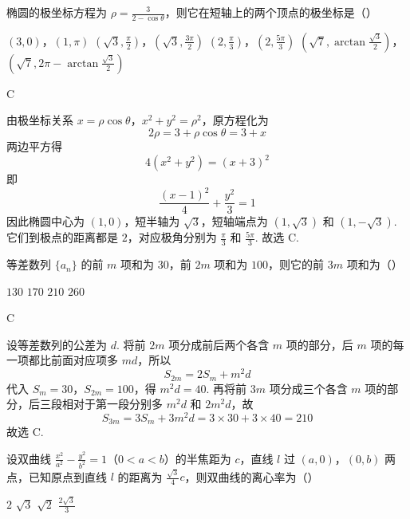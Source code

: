 \begin{problem}
椭圆的极坐标方程为 \(\rho = \frac{3}{2 - \cos\theta}\)，则它在短轴上的两个顶点的极坐标是（\quad）

\choices
    {\((3,0)\)，\((1,\pi)\)}
    {\(\left(\sqrt{3},\frac{\pi}{2}\right)\)，\(\left(\sqrt{3},\frac{3\pi}{2}\right)\)}
    {\(\left(2,\frac{\pi}{3}\right)\)，\(\left(2,\frac{5\pi}{3}\right)\)}
    {\(\left(\sqrt{7}, \arctan \frac{\sqrt{3}}{2}\right)\)，\(\left(\sqrt{7}, 2\pi - \arctan \frac{\sqrt{3}}{2}\right)\)}
\end{problem}

\begin{answer}
C
\end{answer}

\begin{solution}
由极坐标关系 \(x=\rho\cos\theta\)，\(x^2+y^2=\rho^2\)，原方程化为
\[
2\rho=3+\rho\cos\theta=3+x
\]
两边平方得
\[
4(x^2+y^2)=(x+3)^2
\]
即
\[
\frac{(x-1)^2}{4}+\frac{y^2}{3}=1
\]
因此椭圆中心为 \((1,0)\)，短半轴为 \(\sqrt3\)，短轴端点为 \((1,\sqrt3)\) 和 \((1,-\sqrt3)\). 它们到极点的距离都是 \(2\)，对应极角分别为 \(\frac{\pi}{3}\) 和 \(\frac{5\pi}{3}\). 故选 C.
\end{solution}

\begin{problem}
等差数列 \(\{a_{n}\}\) 的前 \(m\) 项和为 \(30\)，前 \(2m\) 项和为 \(100\)，则它的前 \(3m\) 项和为（\quad）

\choices
    {\(130\)}
    {\(170\)}
    {\(210\)}
    {\(260\)}
\end{problem}

\begin{answer}
C
\end{answer}

\begin{solution}
设等差数列的公差为 \(d\). 将前 \(2m\) 项分成前后两个各含 \(m\) 项的部分，后 \(m\) 项的每一项都比前面对应项多 \(md\)，所以
\[
S_{2m}=2S_m+m^2d
\]
代入 \(S_m=30\)，\(S_{2m}=100\)，得 \(m^2d=40\). 再将前 \(3m\) 项分成三个各含 \(m\) 项的部分，后三段相对于第一段分别多 \(m^2d\) 和 \(2m^2d\)，故
\[
S_{3m}=3S_m+3m^2d=3\times30+3\times40=210
\]
故选 C.
\end{solution}

\begin{problem}
设双曲线 \(\frac{x^2}{a^2} - \frac{y^2}{b^2} = 1\)（\(0 < a < b\)）的半焦距为 \(c\)，直线 \(l\) 过 \((a,0)\)，\((0,b)\) 两点，已知原点到直线 \(l\) 的距离为 \(\frac{\sqrt{3}}{4} c\)，则双曲线的离心率为（\quad）

\choices
    {\(2\)}
    {\(\sqrt{3}\)}
    {\(\sqrt{2}\)}
    {\(\frac{2\sqrt{3}}{3}\)}
\end{problem}

